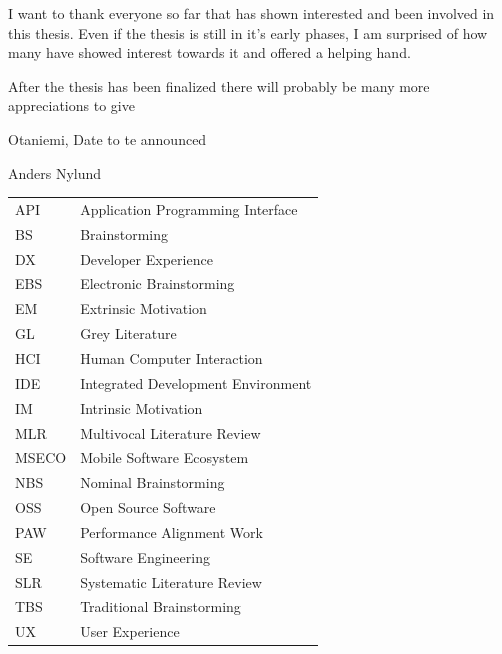 \documentclass[english, 12pt, a4paper, sci, utf8, a-1b, online]{aaltothesis}
\begin{document}
I want to thank everyone so far that has shown interested and been involved in this thesis. Even if the thesis is still in it's early phases, I am surprised of how many have showed interest towards it and offered a helping hand.

After the thesis has been finalized there will probably be many more appreciations to give

\vspace{5cm}
Otaniemi, Date to te announced

\vspace{5mm}
{\hfill Anders Nylund \hspace{1cm}}

\newpage


\thesistableofcontents


\begin{tabular}{ll}
  API   & Application Programming Interface  \\
  BS    & Brainstorming                      \\
  DX    & Developer Experience               \\
  EBS   & Electronic Brainstorming           \\
  EM    & Extrinsic Motivation               \\
  GL    & Grey Literature                    \\
  HCI   & Human Computer Interaction         \\
  IDE   & Integrated Development Environment \\
  IM    & Intrinsic Motivation               \\
  MLR   & Multivocal Literature Review       \\
  MSECO & Mobile Software Ecosystem          \\
  NBS   & Nominal Brainstorming              \\
  OSS   & Open Source Software               \\
  PAW   & Performance Alignment Work         \\
  SE    & Software Engineering               \\
  SLR   & Systematic Literature Review       \\
  TBS   & Traditional Brainstorming          \\
  UX    & User Experience                    \\
\end{tabular}
\end{document}
